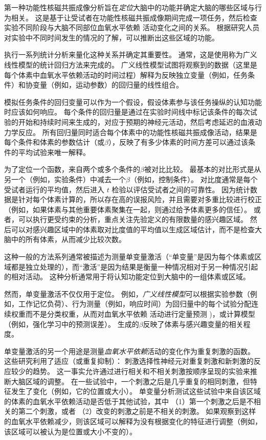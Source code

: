 第一种功能性核磁共振成像分析旨在\textit{定位}大脑中的功能并确定大脑的哪些区域与行为相关。 
这是基于让受试者在功能性核磁共振成像期间完成一项任务，然后检查实验不同阶段与大脑不同部位血氧水平依赖 活动变化之间的关系。 
根据研究人员对实验中不同时间发生的情况的了解，可以推断出这些区域的功能。


执行一系列统计分析来量化这种关系并确定其重要性。 
通常，这是使用称为广义线性模型的统计回归方法来完成的。 
广义线性模型试图将观察到的数据（这里是每个体素中血氧水平依赖活动的时间过程）解释为反映独立变量（例如，任务条件）和协变量（例如，运动参数）的回归量的线性组合。


模拟任务条件的回归变量可以作为一个假设，假设体素参与该任务操纵的认知功能时应该如何响应。
每个条件的回归量是通过在实验时间线中标记该条件的每次试验的开始和持续时间来生成的，对应于预期的神经元活动，然后考虑延迟的血液动力学反应。
所有回归量同时适合每个体素中的功能性核磁共振成像活动，结果是每个条件和体素的参数估计（或$\beta$），反映了有多少体素的时间方差可以通过该条件的平均试验来唯一解释。


为了定位一个函数，来自两个或多个条件的$\beta$被对比比较。 
最基本的对比形式是从另一个（例如，实验条件）中减去一个$\beta$（例如，控制条件）。 
对比度通常是每个受试者运行的平均值，然后进入 $t$ 检验以评估受试者之间的可靠性。 
因为统计数据是针对每个体素计算的，所以存在高的误报风险，并且需要对多重比较进行校正（例如，如果体素与其他重要体素聚集在一起，则通过给予体素更多的信任）。 
或者，可以执行更受约束的分析，重点关注先验定义的有限数量的感兴趣区域。 
然后可以对感兴趣区域中的体素取对比度值的平均值以生成区域估计，而不是检查大脑中的所有体素，从而减少比较次数。


这种一般的方法系列通常被描述为测量单变量激活（“单变量”是因为每个体素或区域都是独立处理的），而“激活”是因为结果是衡量一种情况相对于另一种情况引起的相对活动。
这种分析通常用于将认知功能定位到大脑中的一组体素或区域。


然而，单变量激活不仅仅用于定位。
例如，\textit{广义线性模型}可以根据实验参数（例如，工作记忆负荷）、行为测量（例如，响应时间）为回归量中的每个试验分配连续权重而不是分类权重，从而对血氧水平依赖 活动进行定量预测 )，或计算模型（例如，强化学习中的预测误差）。
生成的$\beta$反映了体素与感兴趣变量的相关程度。


单变量激活的另一个用途是测量\textit{血氧水平依赖}活动的变化作为重复刺激的函数。
这些研究利用了适应（或重复抑制）：
刺激选择性神经元对重复刺激和新刺激的反应较少的趋势。
这一事实允许通过进行相关和不相关刺激按顺序呈现的实验来推断大脑区域的调整。
在一些试验中，一个刺激之后是几乎重复的相同刺激，但特征发生了变化（例如，它的位置或大小）。
单变量分析测试这些试验中来自该区域的体素的血氧水平依赖活动是否低于其他试验，其中
（1）第一个刺激之后是不相关的第二个刺激，或者
（2）改变的刺激之前是不相关的刺激。
如果观察到这样的血氧水平依赖减少，则该区域可以解释为没有根据变化的特征进行调整（例如，该区域可以被认为是位置或大小不变的）。


